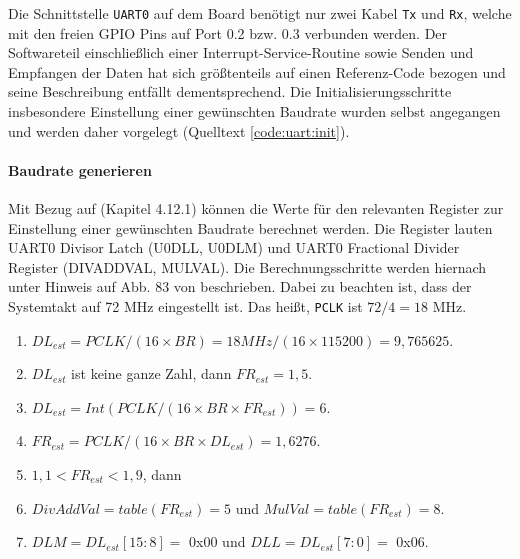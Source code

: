 
Die Schnittstelle \texttt{UART0} auf dem Board benötigt nur zwei Kabel \texttt{Tx} und \texttt{Rx}, welche mit den freien GPIO Pins auf Port 0.2 bzw. 0.3 verbunden werden. Der Softwareteil einschließlich einer Interrupt-Service-Routine sowie Senden und Empfangen der Daten hat sich größtenteils auf einen Referenz-Code bezogen und seine Beschreibung entfällt dementsprechend. Die Initialisierungsschritte insbesondere Einstellung einer gewünschten Baudrate wurden selbst angegangen und werden daher vorgelegt (Quelltext \ref{code:uart:init}).

\paragraph{Baudrate generieren} 
Mit Bezug auf \cite{nxp.lpc23xx.user_manual} (Kapitel 4.12.1) können die Werte für den relevanten Register zur Einstellung einer gewünschten Baudrate berechnet werden. Die Register lauten UART0 Divisor Latch (U0DLL, U0DLM) und UART0 Fractional Divider Register (DIVADDVAL, MULVAL). Die Berechnungsschritte werden hiernach unter Hinweis auf Abb. 83 von \cite{nxp.lpc23xx.user_manual} beschrieben. Dabei zu beachten ist, dass der Systemtakt auf 72 MHz eingestellt ist. Das heißt, \texttt{PCLK} ist $72/4 = 18$ MHz.

\begin{enumerate}
\item $DL_{est} = PCLK/(16 \times BR) = 18 MHz/(16 \times 115200) = 9,765625$.
\item $DL_{est}$ ist keine ganze Zahl, dann $FR_{est} = 1,5$.
\item $DL_{est} = Int ( PCLK/(16 \times BR \times FR_{est}) ) = 6$.
\item $FR_{est} = PCLK/(16 \times BR \times DL_{est}) = 1,6276$.
\item $1,1 < FR_{est} < 1,9$, dann
\item $DivAddVal = table (FR_{est}) = 5$ und $MulVal = table (FR_{est}) = 8$.
\item $DLM = DL_{est}[15:8] =$ 0x00 und $DLL = DL_{est}[7:0] =$ 0x06.
\end{enumerate}

